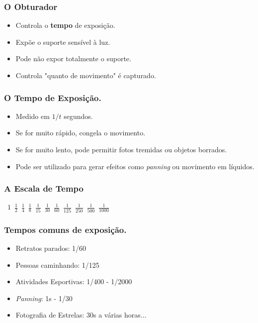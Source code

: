 \begin{frame}
    \frametitle{O Obturador}
    \begin{itemize}
        \item Controla o \textbf{tempo} de exposição.
        \item Expõe o suporte sensível à luz.
        \item Pode não expor totalmente o suporte.
        \item Controla "quanto de movimento" é capturado.
    \end{itemize}
\end{frame}

\begin{frame}
    \frametitle{O Tempo de Exposição.}
    \begin{itemize}
        \item Medido em $1/t$ segundos.
        \item Se for muito rápido, congela o movimento.
        \item Se for muito lento, pode permitir fotos tremidas ou objetos borrados.
        \item Pode ser utilizado para gerar efeitos como \textit{panning} ou movimento em líquidos.
    \end{itemize}
\end{frame}

\begin{frame}
    \frametitle{A Escala de Tempo}
    \vfill
    \begin{center}
    \mbox{
    \huge $1$
    \hfill
    \huge $\frac{1}{2}$
    \hfill
    \huge $\frac{1}{4}$
    \hfill
    \huge $\frac{1}{8}$
    \hfill
    \huge $\frac{1}{15}$
    \hfill
    \huge $\frac{1}{30}$
    \hfill
    \huge $\frac{1}{60}$
    \hfill
    \huge $\frac{1}{125}$
    \hfill
    \huge $\frac{1}{250}$
    \hfill
    \huge $\frac{1}{500}$
    \hfill
    \huge $\frac{1}{1000}$
    }
    \end{center}
    \vfill
\end{frame}

\begin{frame}
    \frametitle{Tempos comuns de exposição.}
    \begin{itemize}
        \item Retratos parados: 1/60
        \item Pessoas caminhando: 1/125
        \item Atividades Esportivas: 1/400 - 1/2000
        \item \textit{Panning}: 1s - 1/30
        \item Fotografia de Estrelas: 30s a várias horas...
    \end{itemize}
\end{frame}

